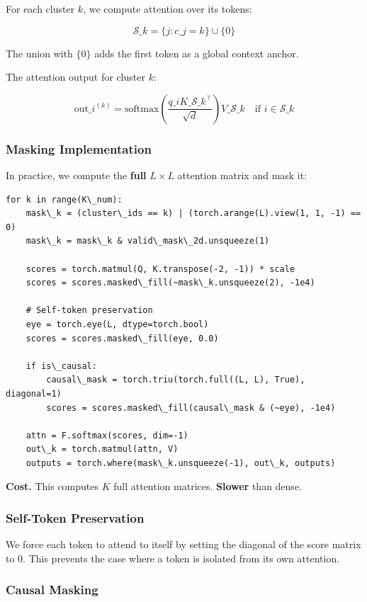 For each cluster $k$, we compute attention over its tokens:

\[
\mathcal{S}\_k = \{j : c\_j = k\} \cup \{0\}
\tag{4.2}
\]

The union with $\{0\}$ adds the first token as a global context anchor.

The attention output for cluster $k$:

\[
\text{out}\_i^{(k)} = \text{softmax}\!\left(\frac{q\_i K\_{\mathcal{S}\_k}^\top}{\sqrt{d}}\right) V\_{\mathcal{S}\_k} \quad \text{if } i \in \mathcal{S}\_k
\tag{4.3}
\]

\subsubsection{Masking Implementation}

In practice, we compute the \textbf{full} $L \times L$ attention matrix and mask 
it:

\begin{lstlisting}
for k in range(K\_num):
    mask\_k = (cluster\_ids == k) | (torch.arange(L).view(1, 1, -1) == 0)
    mask\_k = mask\_k & valid\_mask\_2d.unsqueeze(1)
    
    scores = torch.matmul(Q, K.transpose(-2, -1)) * scale
    scores = scores.masked\_fill(~mask\_k.unsqueeze(2), -1e4)
    
    # Self-token preservation
    eye = torch.eye(L, dtype=torch.bool)
    scores = scores.masked\_fill(eye, 0.0)
    
    if is\_causal:
        causal\_mask = torch.triu(torch.full((L, L), True), diagonal=1)
        scores = scores.masked\_fill(causal\_mask & (~eye), -1e4)
    
    attn = F.softmax(scores, dim=-1)
    out\_k = torch.matmul(attn, V)
    outputs = torch.where(mask\_k.unsqueeze(-1), out\_k, outputs)
\end{lstlisting}

\textbf{Cost.} This computes $K$ full attention matrices. \textbf{Slower} than dense.

\subsubsection{Self-Token Preservation}

We force each token to attend to itself by setting the diagonal of the score 
matrix to 0. This prevents the case where a token is isolated from its own 
attention.

\subsubsection{Causal Masking}


